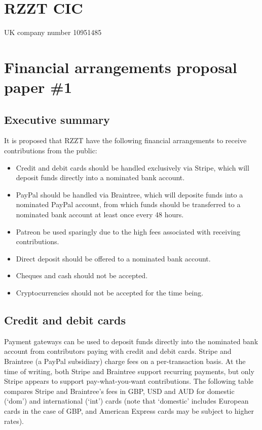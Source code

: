 \documentclass[a4paper,10pt]{article}
\begin{document}
\thispagestyle{firstpage}

\raggedright

\section{RZZT CIC}

UK company number 10951485

\section{Financial arrangements proposal paper \#1}

\subsection{Executive summary}

It is proposed that RZZT have the following financial arrangements to receive contributions from the public:

\begin{itemize}
\setlength\itemsep{-0.5em}
\item Credit and debit cards should be handled exclusively via Stripe, which will deposit funds directly into a nominated bank account.
\item PayPal should be handled via Braintree, which will deposite funds into a nominated PayPal account, from which funds should be transferred to a nominated bank account at least once every 48 hours.
\item Patreon be used sparingly due to the high fees associated with receiving contributions.
\item Direct deposit should be offered to a nominated bank account.
\item Cheques and cash should not be accepted.
\item Cryptocurrencies should not be accepted for the time being.
\end{itemize}

\subsection{Credit and debit cards}

Payment gateways can be used to deposit funds directly into the nominated bank account from contributors paying with credit and debit cards. Stripe and Braintree (a PayPal subsidiary) charge fees on a per-transaction basis. At the time of writing, both Stripe and Braintree support recurring payments, but only Stripe appears to support pay-what-you-want contributions. The following table compares Stripe and Braintree's fees in GBP, USD and AUD for domestic (`dom') and international (`int') cards (note that `domestic' includes European cards in the case of GBP, and American Express cards may be subject to higher rates).
\end{document}
